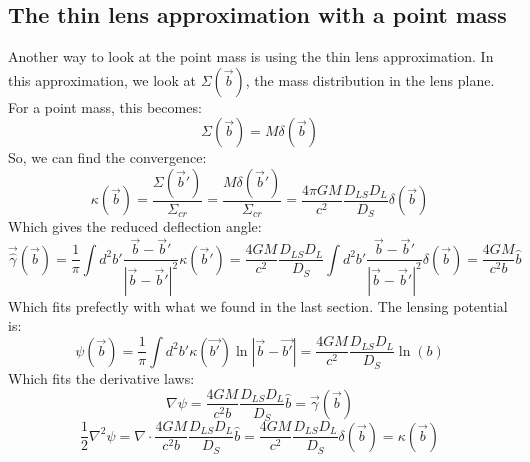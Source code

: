 \documentclass{article}
\begin{document}
\subsection{The thin lens approximation with a point mass}
Another way to look at the point mass is using the thin lens approximation. In this approximation, we look at $\Sigma(\vec{b})$, the mass distribution in the lens plane. For a point mass, this becomes:
\begin{equation}
    \Sigma(\vec{b}) = M\delta(\vec{b})
\end{equation}
So, we can find the convergence:
\begin{equation}
    \kappa(\vec{b}) = \frac{\Sigma(\vec{b}')}{\Sigma_{cr}} = \frac{M\delta(\vec{b}')}{\Sigma_{cr}} = \frac{4\pi GM}{c^2} \frac{D_{LS}D_{L}}{D_S}\delta(\vec{b})
\end{equation}
Which gives the reduced deflection angle:
\begin{equation}
    \vec{\hat{\gamma}}(\vec{b}) =
    \frac{1}{\pi}\int d^2b'\frac{\vec{b} - \vec{b}'}{\left|\vec{b} - \vec{b}'\right|^2}\kappa(\vec{b}') = 
    \frac{4GM}{c^2} \frac{D_{LS}D_{L}}{D_S}\int d^2b'\frac{\vec{b} - \vec{b}'}{\left|\vec{b} - \vec{b}'\right|^2}\delta(\vec{b}) = 
    \frac{4GM}{c^2b}\hat{b}
\end{equation}
Which fits prefectly with what we found in the last section.
The lensing potential is:
\begin{equation}
    \psi(\vec{b}) =
    \frac{1}{\pi}\int d^2b' \kappa(\vec{b'})\ln\left|\vec{b} - \vec{b'}\right| =
    \frac{4GM}{c^2} \frac{D_{LS}D_{L}}{D_S}\ln(b)
\end{equation}
Which fits the derivative laws:
\begin{equation}
    \nabla \psi = \frac{4GM}{c^2b} \frac{D_{LS}D_{L}}{D_S}\hat{b} = \vec{\gamma}(\vec{b})
\end{equation}
\begin{equation}
    \frac{1}{2}\nabla^2 \psi = \nabla \cdot \frac{4GM}{c^2b} \frac{D_{LS}D_{L}}{D_S}\hat{b} = \frac{4GM}{c^2} \frac{D_{LS}D_{L}}{D_S}\delta(\vec{b}) = \kappa(\vec{b})
\end{equation}

\newpage
\end{document}
